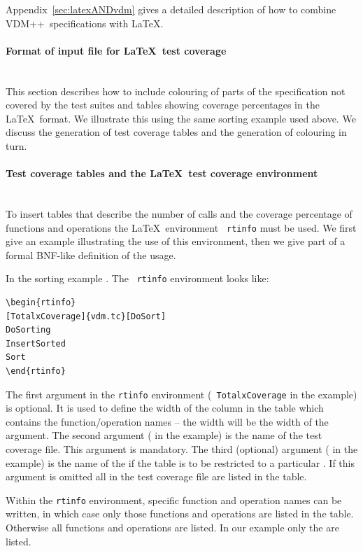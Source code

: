 \documentclass[\pformat,12pt]{article}
\newcommand{\vdmslpp}{VDM++}
\newcommand{\subsubsubsection}[1]{\paragraph{#1}\mbox{}\\}
\begin{document}
Appendix~\ref{sec:latexANDvdm} gives a detailed description of how to
combine \vdmslpp\ specifications with \LaTeX.


\subsubsubsection{Format of input file for \LaTeX\ test coverage}

This section describes how to include colouring of parts of the
specification not covered by the test suites and tables showing
coverage percentages in the \LaTeX\ format. We illustrate this using
the same sorting example used above. We discuss the generation of test
coverage tables and the generation of colouring in turn.

\subsubsubsection{Test coverage tables and the \LaTeX\ test coverage environment}

To insert tables that describe the number of calls and the coverage
percentage of functions and operations the \LaTeX\ environment {\tt
  rtinfo} must be used.  We first give an example illustrating the use
of this environment, then we give part of a formal BNF-like definition
of the usage.

In the sorting example .  The {\tt
  rtinfo} environment looks like:


\begin{verbatim}
\begin{rtinfo}
[TotalxCoverage]{vdm.tc}[DoSort]
DoSorting
InsertSorted
Sort
\end{rtinfo}
\end{verbatim}

The first argument in the {\tt rtinfo} environment ({\tt
  TotalxCoverage} in the example) is optional. 
It is used to define the width of the column in the table which
contains the function/operation names -- the width will be the width
of the argument.  The second argument
( in the example) is the  
name of the test coverage file.  This argument is mandatory.  The third
(optional) argument ( in the example) is the name of the
 if the table is to be
restricted to a  particular
. If this argument is
omitted all  in the test
coverage file are listed in the table.

Within the {\tt rtinfo} environment, specific function and
operation names can be written, in which case only those
functions and operations are listed in the table. Otherwise all
functions and operations are listed.  In our example only the 
 are listed.
\end{document}
